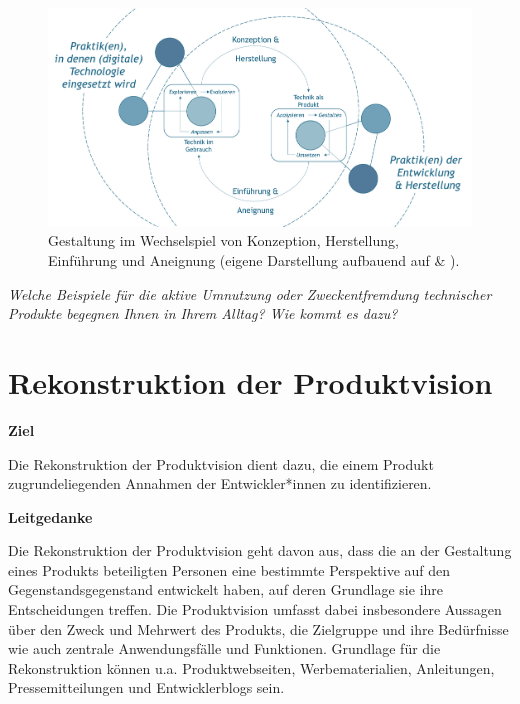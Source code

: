 \documentclass[
  a4paper,
]{book}
\begin{document}
\begin{figure}
\centering
\includegraphics{Figures/08-04-Gestaltung-Wechselspiel.png}
\caption{\label{fig:fig11}Gestaltung im Wechselspiel von Konzeption, Herstellung, Einführung und Aneignung (eigene Darstellung aufbauend auf \citet{bolinHeuristicsAlgorithmBig2015} \& \citet{shoveDynamicsSocialPractice2012}).}
\end{figure}

\begin{blackbox}
\emph{Welche Beispiele für die aktive Umnutzung oder Zweckentfremdung technischer Produkte begegnen Ihnen in Ihrem Alltag? Wie kommt es dazu?}

\end{blackbox}

\section{Rekonstruktion der Produktvision}\label{rekonstruktion-der-produktvision}

\textbf{Ziel}

Die Rekonstruktion der Produktvision dient dazu, die einem Produkt zugrundeliegenden Annahmen der Entwickler*innen zu identifizieren.

\textbf{Leitgedanke}

Die Rekonstruktion der Produktvision geht davon aus, dass die an der Gestaltung eines Produkts beteiligten Personen eine bestimmte Perspektive auf den Gegenstandsgegenstand entwickelt haben, auf deren Grundlage sie ihre Entscheidungen treffen. Die Produktvision umfasst dabei insbesondere Aussagen über den Zweck und Mehrwert des Produkts, die Zielgruppe und ihre Bedürfnisse wie auch zentrale Anwendungsfälle und Funktionen. Grundlage für die Rekonstruktion können u.a. Produktwebseiten, Werbematerialien, Anleitungen, Pressemitteilungen und Entwicklerblogs sein.
\end{document}
